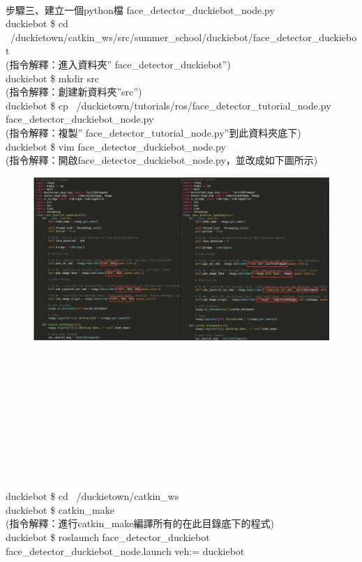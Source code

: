 \documentclass{article}
\begin{document}
\\
步驟三、建立一個python檔 face\_detector\_duckiebot\_node.py
\\duckiebot \$ cd ~/duckietown/catkin\_ws/src/summer\_school/duckiebot/face\_detector\_duckiebot
\\(指令解釋：進入資料夾” face\_detector\_duckiebot”)
\\duckiebot \$ mkdir src
\\(指令解釋：創建新資料夾”src”)
\\duckiebot \$ cp ~/duckietown/tutorials/ros/face\_detector\_tutorial\_node.py face\_detector\_duckiebot\_node.py
\\(指令解釋：複製” face\_detector\_tutorial\_node.py”到此資料夾底下)
\\duckiebot \$ vim face\_detector\_duckiebot\_node.py
\\(指令解釋：開啟face\_detector\_duckiebot\_node.py，並改成如下圖所示)
\begin{figure}[htp]
    \begin{center}
        \includegraphics[width=400pt]{pic/5_3_11.png}
    \end{center}
\end{figure}
\\\\\\\\\\\\\\\\\\
\\duckiebot \$ cd ~/duckietown/catkin\_ws
\\duckiebot \$ catkin\_make
\\(指令解釋：進行catkin\_make編譯所有的在此目錄底下的程式)
\\duckiebot \$ roslaunch face\_detector\_duckiebot face\_detector\_duckiebot\_node.launch veh:= duckiebot
\end{document}
